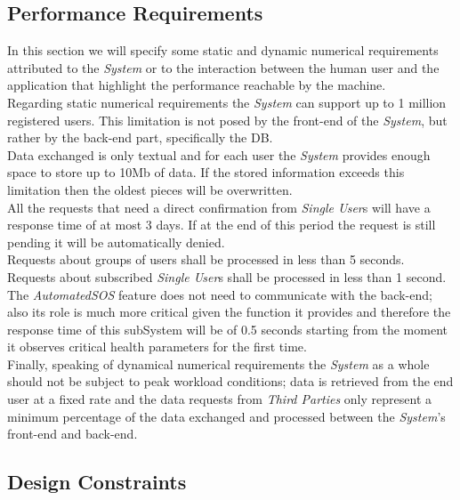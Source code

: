 \documentclass[titlepage]{article}
\begin{document}
		
		\subsection{Performance Requirements}
		In this section we will specify some static and dynamic numerical requirements attributed to the {\it System} or to the 	interaction between the human user and the application that highlight the performance reachable by the machine. \\
	Regarding static numerical requirements the {\it System} can support up to 1 million registered users. This limitation is not 	posed by the front-end of the {\it System}, but rather by the back-end part, specifically the DB.\\
	Data exchanged is only textual and for each user the {\it System} provides enough space to store up to 10Mb of data. If the 	stored information exceeds this limitation then the oldest pieces will be overwritten.\\
	All the requests that need  a direct confirmation from {\it Single User}s will have a response time of at most 3 days. If at the 	end of this period the request is still pending it will be automatically denied.\\
	Requests about groups of users shall be processed in less than 5 seconds.\\
	Requests about subscribed {\it Single User}s shall be processed in less than 1 second.\\
	The {\it AutomatedSOS} feature does not need to communicate with the back-end; also its role is much more critical given 	the function it provides and therefore the response time of this subSystem will be of 0.5 seconds starting from the 		moment it observes critical health parameters for the first time.\\
	Finally, speaking of dynamical numerical requirements the {\it System} as a whole should not be subject to peak workload 	conditions; data is retrieved from the end user at a fixed rate and the data requests from {\it Third Parties} only represent a 	minimum percentage of the data exchanged and processed between the {\it System}’s front-end and back-end.\\
	
		\subsection{Design Constraints}
		
\end{document}
